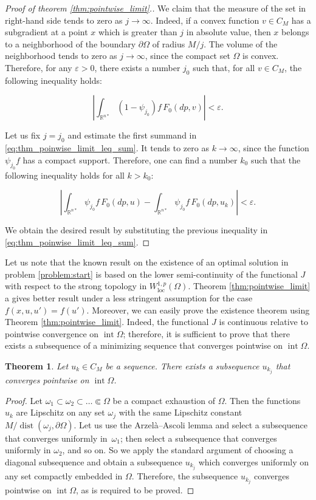 \documentclass[14pt]{extarticle}
\newcommand{\R}{\mathbb{R}}
\DeclareMathOperator{\Int}{\mathrm{int}}
\DeclareMathOperator{\dist}{\mathrm{dist}}
\newtheorem{thm}{Theorem}
\theoremstyle{remark}
\theoremstyle{definition}
\begin{document}
\begin{proof}[Proof of theorem \ref{thm:pointwise_limit}.]
	We claim that the measure of the set in right-hand side tends to zero as $j\to\infty$. Indeed, if a convex function $v\in C_M$ has a subgradient at a point $x$ which is greater than $j$ in absolute value, then $x$ belongs to a neighborhood of the boundary $\partial \Omega$ of radius $M/j$. The volume of the neighborhood tends to zero as $j\to\infty$, since the compact set $\Omega$ is convex. Therefore, for any $\varepsilon>0$, there exists a number $j_0$ such that, for all $v\in C_M$, the following inequality holds:
	
	\[
		\left|\int_{\R^{n*}}(1-\psi_{j_0})f\,F_0(dp,v)\right| <\varepsilon.
	\]

	Let us fix $j=j_0$ and estimate the first summand in \eqref{eq:thm_poinwise_limit_leq_sum}. It tends to zero as $k\to\infty$, since the function  $\psi_{j_0} f$ has a compact support. Therefore, one can find a number $k_0$ such that the following inequality holds for all $k>k_0$:
 
	\[
		\left|\int_{\R^{n*}}\psi_{j_0} f\,F_0(dp,u) - \int_{\R^{n*}}\psi_{j_0} f\,F_0(dp,u_k)\right| < \varepsilon.
	\]

	\noindent We obtain the desired result by substituting the previous inequality in \eqref{eq:thm_poinwise_limit_leq_sum}.
\end{proof}

Let us note that the known result \cite{Marcellini1990,Buttazzo1995} on the existence of an optimal solution in problem \eqref{problem:start} is based on the lower semi-continuity of the functional $J$ with respect to the strong topology in $W_{\mathrm{loc}}^{1,p}(\Omega)$. Theorem \ref{thm:pointwise_limit} a gives better result under a less stringent assumption for the case $f(x,u,u')=f(u')$. Moreover, we can easily prove the existence theorem using Theorem \ref{thm:pointwise_limit}. Indeed, the functional $J$ is continuous relative to pointwise convergence on $\Int\Omega$; therefore, it is sufficient to prove that there exists a subsequence of a minimizing sequence that converges pointwise on $\Int\Omega$.

\begin{thm}
\label{thm:C_M_compact}
	Let $u_k\in C_M$ be a sequence. There exists a subsequence $u_{k_j}$ that converges pointwise on $\Int\Omega$.
\end{thm}

\begin{proof}
Let $\omega_1\subset\omega_2\subset\ldots\Subset\Omega$ be a compact exhaustion of $\Omega$. Then the functions $u_k$ are Lipschitz on any set $\omega_j$ with the same Lipschitz constant $M/\dist(\omega_j,\partial\Omega)$. Let us use the Arzel\`a--Ascoli lemma and select a subsequence that converges uniformly in~$\omega_1$; then select a subsequence that converges uniformly in $\omega_2$, and so on. So we apply the standard argument of choosing a diagonal subsequence and obtain a subsequence $u_{k_j}$ which converges uniformly on any set compactly embedded in $\Omega$. Therefore, the subsequence $u_{k_j}$ converges pointwise on $\Int\Omega$, as is required to be proved.

\end{proof}
\end{document}

